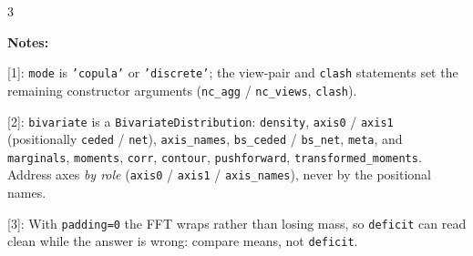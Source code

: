\begin{multicols*}{3}





\bigskip \raggedright
{\bf Notes:}

[1]: \texttt{mode} is \texttt{'copula'} or \texttt{'discrete'}; the view-pair and \texttt{clash} statements set the remaining constructor arguments (\texttt{nc\_agg} / \texttt{nc\_views}, \texttt{clash}).

[2]: \texttt{bivariate} is a \texttt{BivariateDistribution}: \texttt{density}, \texttt{axis0} / \texttt{axis1} (positionally \texttt{ceded} / \texttt{net}), \texttt{axis\_names}, \texttt{bs\_ceded} / \texttt{bs\_net}, \texttt{meta}, and \texttt{\m marginals}, \texttt{\m moments}, \texttt{\m corr}, \texttt{\m contour}, \texttt{\m pushforward}, \texttt{\m transformed\_moments}. Address axes \emph{by role} (\texttt{axis0} / \texttt{axis1} / \texttt{axis\_names}), never by the positional names.

[3]: With \texttt{padding=0} the FFT wraps rather than losing mass, so \texttt{deficit} can read clean while the answer is wrong: compare means, not \texttt{deficit}.


\makefooter



\end{multicols*}


